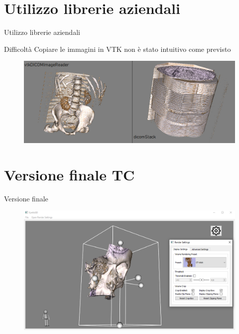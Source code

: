 \documentclass{beamer}
\begin{document}
	\section{Utilizzo librerie aziendali}
	\begin{frame}{Utilizzo librerie aziendali}
	
	\begin{alertblock}{Difficoltà}
		Copiare le immagini in VTK non è stato intuitivo come previsto
	\end{alertblock}
	
	\begin{figure}[ht]
    	\centering
    	\includegraphics[width=1\textwidth]{Images/volumebrokenorder.jpg}
	\end{figure}
	
	\end{frame}
	
	
	\section{Versione finale TC}
	\begin{frame}{Versione finale}
	
	\begin{figure}[ht]
    	\centering
    	\includegraphics[width=1\textwidth]{Images/finalnewui.png}
	\end{figure}
	
	\end{frame}
	
\end{document}
